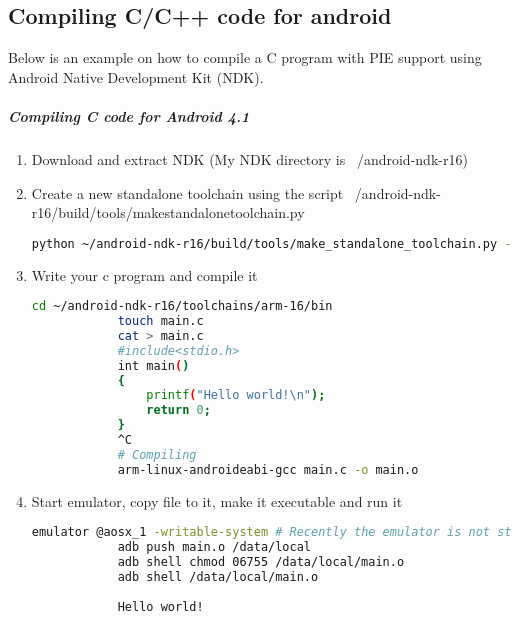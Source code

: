 \documentclass[../main.tex]{subfile}
\begin{document}
	\begin{appendices}
		\chapter{Compiling C/C++ code for android}
		Below is an example on how to compile a C program with PIE support using Android Native Development Kit (NDK).
		\paragraph{Compiling C code for Android 4.1}
		\begin{enumerate}
			\item Download and extract NDK (My NDK directory is ~/android-ndk-r16)
			\item Create a new standalone toolchain using the script ~/android-ndk-r16/build/tools/make\textunderscore standalone\textunderscore toolchain.py
			\begin{lstlisting}[language=bash, numbers=none]
				python ~/android-ndk-r16/build/tools/make_standalone_toolchain.py --arch arm --api 16 --install-dir ~/android-ndk-r16/toolchains/arm-16
			\end{lstlisting}
			\item Write your c program and compile it
			\begin{lstlisting}[language=bash]
			cd ~/android-ndk-r16/toolchains/arm-16/bin
			touch main.c
			cat > main.c
			#include<stdio.h>
			int main()
			{
				printf("Hello world!\n");
				return 0;
			}
			^C
			# Compiling
			arm-linux-androideabi-gcc main.c -o main.o
			\end{lstlisting}
			
			\item Start emulator, copy file to it, make it executable and run it
			
			\begin{lstlisting}[language=bash]
			emulator @aosx_1 -writable-system # Recently the emulator is not starting without writable, check if yours do
			adb push main.o /data/local
			adb shell chmod 06755 /data/local/main.o
			adb shell /data/local/main.o
			
			Hello world!
			\end{lstlisting}
		\end{enumerate}		



\end{appendices}
\end{document}
